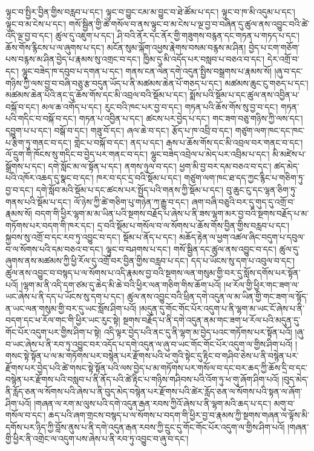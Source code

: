 ལྟུང་བ་སྤྱིར་བྱིན་གྱིས་བརླབ་པ་དང་། ལྟུང་བ་བྱུང་ངམ་མ་བྱུང་བ་ཐེ་ཚོམ་པ་དང་། ལྟུང་བ་ཁ་མི་འདུམ་པ་དང་། ལྟུང་བ་མ་ངེས་པ་དང་། གསོ་སྦྱིན་གྱི་ཚེ་གསོལ་བ་ནས་ལྟུང་བ་མ་ངེས་པ་ལྔ་བྱ་བ་བཞིན་དུ་ཚུལ་ནས་འབྱུང་བའི་ཚེ་འདི་ལྔ་བྱ་བ་དང་། ཚུལ་དུ་འཇུག་པ་དང་། ཤི་བའི་ནོར་དང་ནོར་གྱི་གཟུགས་བརྙན་དང་གཏན་པ་གཏད་པ་དང་། ཆོས་གོས་རྙིངས་པ་ལ་ཞུགས་པ་དང་། མངོན་སུམ་ལྐོག་འཕྱས་རྣེགས་བསམ་བརྙས་མ་ཤིན། བྱེད་པ་ངག་གཅོག་པས་བརྙས་མ་ཤིན་བྱེད་པ་རྣམས་སུ་འགྲང་བ་དང་། ཁྱིམ་དུ་མི་འདོད་པར་བསླབ་པ་བཅའ་བ་དང་། དེར་འགྲོ་བ་དང་། ལྷུང་བཟེད་ཁ་དབུབ་པ་དགན་པ་དང་། གནས་ངན་ལེན་དགེ་འདུན་སྤྱིས་བསྒྲགས་པ་རྣམས་སོ། །ཞུ་བ་དང་གཉིས་ཀྱི་ལས་བྱ་བ་བཞི་བཅུ་རྩ་བདུན་ཡོད་པ་ནི་མཚམས་ཆེན་པོ་གཅད་པ་དང་། མཚམས་ཆུང་ངུ་གཅད་པ་དང་། མཚམས་ཆེན་པོའི་ནང་དུ་ཆོས་གོས་དང་མི་འབྲལ་བའི་སྡོམ་པ་དང་། སྨོས་པའི་སྡོམ་པ་དང་ཚུལ་ནས་འབྱིན་པ་བསྐོ་བ་དང་། མལ་ཆ་འགོད་པ་དང་། རུང་བའི་ཁང་པར་བྱ་བ་དང་། གཏན་པའི་ཆོས་གོས་སུ་བྱ་བ་དང་། གཏན་པའི་གདིང་བ་བསྐོ་བ་དང་། གཏན་པ་འབྱིན་པ་དང་། ཚངས་པར་བྱེད་པ་དང་། གང་ཟག་བཅུ་གཉིས་ཀྱི་ལས་དང་། དབྱུག་པ་པ་དང་། བསྒོ་བ་དང་། གཟུ་བོ་དང་། ཞལ་ཆེ་བ་དང་། རྩོད་པ་ཁ་འབྲི་བ་དང་། གཙུག་ལག་ཁང་དང་ཁང་པ་རྩིག་ཏུ་གནང་བ་དང་། གླེང་པ་བསྐོ་བ་དང་། ནད་པ་དང་། རྒས་པ་ཆོས་གོས་དང་མི་འབྲལ་བར་གནང་བ་དང་། ལོ་དྲུག་གི་ཁོངས་སུ་གདིང་བ་བྱེད་པར་གནང་བ་དང་། ལྷུང་བཟེད་འབྲེལ་པ་མེད་པར་འབྲིམ་པ་དང་། མི་མཛེས་པ་སྒྲོགས་པ་དང་། དགེ་སློང་མ་ལ་སྟོན་པ་དང་། ནགས་ཉུལ་བ་དང་། ཕྱག་མི་བྱ་བར་དམ་བཅའ་བ་དང་། ཚད་མེད་པའི་འཁོར་འཆད་དུ་སྣང་བ་དང་། ཁར་བ་དང་དྲ་བའི་སྡོམ་པ་དང་། གཙུག་ལག་ཁང་ཐ་དད་ཀྱང་རྙིང་པ་གཅིག་ཏུ་བྱ་བ་དང་། དགེ་སློབ་མའི་སྡོམ་པ་དང་ཚངས་པར་སྤྱོད་པའི་གནས་ཀྱི་སྡོམ་པ་དང་། བུ་ཆུང་ངུ་དང་ལྷན་ཅིག་ཏུ་གནས་པའི་སྡོམ་པ་དང་། ལོ་ཉེས་ཀྱི་ཚེ་གཅིག་པུ་གཉེན་ཀ་རྒྱུ་བ་དང་། ཞག་བཞི་བཅུའི་བར་དུ་གུད་དུ་འགྲོ་བ་རྣམས་སོ། བདག་གི་ཕྱིར་ལྷག་མ་མ་ཡིན་པའི་སྔགས་བརྗོད་པ་ཞེས་པ་ནི་ཟས་ལྷག་མར་བྱ་བའི་སྔགས་བརྗོད་པ་མ་གཏོགས་པར་བདག་གི་ཁར་དང་། དྲ་བའི་སྡོམ་པ་གསོལ་བ་ལ་སོགས་པ་ཆོས་གོས་བྱིན་གྱིས་བརླབ་པ་དང་། སྐྱབས་སུ་འགྲོ་བ་དང་རབ་ཏུ་འབྱུང་བ་དང་། སྡོམ་པ་ནོད་པ་དང་། མཆོད་རྟེན་ལ་ཕྱག་འཚལ་ཞིང་བདུག་པ་དབུལ་བ་ལ་སོགས་པའི་དམ་བཅའ་བ་དང་། ལྟུང་བ་བཤགས་པ་དང་། གསོ་སྦྱིན་དང་ཚུལ་ནས་འབྱུང་བ་དང་། ཚུལ་དུ་ཞུགས་ནས་མཚམས་ཀྱི་ཕྱི་རོལ་དུ་འགྲོ་བར་བྱིན་གྱིས་བརླབ་པ་དང་། དད་པ་ཡོངས་སུ་དག་པ་འབུལ་བ་དང་། ཚུལ་ནས་འབྱུང་བ་བསྙད་པ་ལ་སོགས་པ་འདི་རྣམས་བྱ་བའི་སྔགས་ལན་གསུམ་གྱི་བར་དུ་སློས་དགོས་པར་སྟོན་པའོ། །ལྷག་མ་ནི་འདི་དག་ཙམ་དུ་ཆེད་མི་ཆེ་བའི་ཕྱིར་ལན་གཅིག་གིས་ཆོག་པའོ། །ཕ་རོལ་གྱི་ཕྱིར་གང་ཟག་ལ་ཡང་ཞེས་པ་ནི་དད་པ་ཡོངས་སུ་དག་པ་དང་། ཚུལ་ནས་འབྱུང་བའི་ཕྲིན་དགེ་འདུན་ལ་མ་ཡིན་གྱི་གང་ཟག་ལ་སྙོད་ན་ཡང་ལན་གསུམ་གྱི་བར་དུ་ཡང་སློས་ཤིག་པའོ། །མདུན་དུ་གོང་གོང་པོར་འདུག་པ་ནི་ལྷག་མ་ཡང་ངོ་ཞེས་པ་ནི་བདག་དང་ཕ་རོལ་གང་གི་ཕྱིར་ཡང་རུང་སྟེ། སྔགས་བརྗོད་པ་ནི་དགེ་འདུན་ནམ་གང་ཟག་ཕ་རོལ་པའི་མདུན་དུ་གོང་པོར་འདུག་པར་གྱིས་ཤིག་པ་སྟེ། འདི་ལྟར་བྱེད་པའི་ནང་དུ་ནི་ལྷག་མ་བྱེད་པའང་གཏོགས་པར་སྟོན་པའོ། །ཞུ་བ་ཡང་ཞེས་པ་ནི་རབ་ཏུ་འབྱུང་བར་འདོད་པ་དགེ་འདུན་ལ་ཞུ་བ་ཡང་གོང་གོང་པོར་འདུག་ལ་གྱིས་ཤིག་པའོ། །གསང་སྟེ་སྟོན་པ་ལ་མ་གཏོགས་པར་བསྙེན་པར་རྫོགས་པའི་ཕ་གུའི་སྟེང་དུ་རྟིང་བ་གཤིབ་ཅེས་པ་ནི་བསྙེན་པར་རྫོགས་པར་བྱེད་པའི་ཚེ་གསང་སྟེ་སྟོན་པའི་ལས་བྱེད་པ་མ་གཏོགས་པར་གསོལ་བ་དང་བར་ཆད་ཀྱི་ཆོས་དྲི་བ་དང་བསྙེན་པར་རྫོགས་པའི་བསླབ་པ་ནི་ནོད་པའི་ཚེ་རྟིང་པ་གཉིས་གཤིབས་པའི་འོག་ཏུ་ཕ་གུ་ཞོག་ཤིག་པའོ། །བུད་མེད་ནི་རློད་ཅན་ལ་སོགས་པའི་ཞེས་པ་ནི་བུད་མེད་བསྙེན་པར་རྫོགས་པའི་ཚེར་རློད་ཅན་ལ་སོགས་པའི་སྟན་ལ་ཞོག་ཤིག་པའོ། །གཞན་ལ་རག་མ་ལུས་པའི་དགེ་འདུན་རྒན་རབས་ཀྱིའོ་ཞེས་པ་ནི་ལྷག་མའི་ཆད་པ་དང་། མགུ་བ་གསོལ་བ་དང་། ཆད་པའི་ཞག་གྲངས་བསྙད་པ་ལ་སོགས་པ་བདག་གི་ཕྱིར་བྱ་བ་རྣམས་ཀྱི་སྔགས་གཞན་ལ་ལྟོས་མི་དགོས་པར་ཉིད་ཀྱི་བློས་ནུས་པ་ནི་དགེ་འདུན་རྒན་རབས་ཀྱི་དྲུང་དུ་གོང་གོང་པོར་འདུག་ལ་གྱིས་ཤིག་པའོ། །གཞན་གྱི་ཕྱིར་ནི་འགྲེང་ལ་འདུག་པས་ཞེས་པ་ནི་རབ་ཏུ་འབྱུང་བ་ཞུ་བ་དང་། 